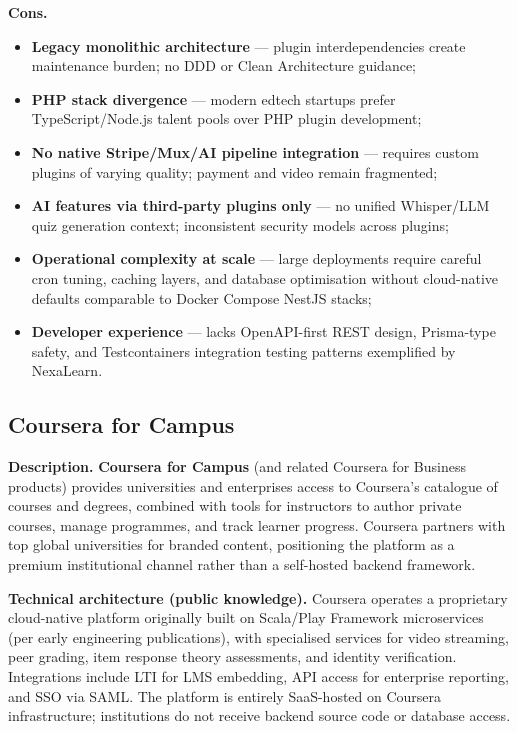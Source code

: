 \textbf{Cons.}
\begin{itemize}
  \item \textbf{Legacy monolithic architecture} --- plugin interdependencies create maintenance burden; no DDD or Clean Architecture guidance;
  \item \textbf{PHP stack divergence} --- modern edtech startups prefer TypeScript/Node.js talent pools over PHP plugin development;
  \item \textbf{No native Stripe/Mux/AI pipeline integration} --- requires custom plugins of varying quality; payment and video remain fragmented;
  \item \textbf{AI features via third-party plugins only} --- no unified Whisper/LLM quiz generation context; inconsistent security models across plugins;
  \item \textbf{Operational complexity at scale} --- large deployments require careful cron tuning, caching layers, and database optimisation without cloud-native defaults comparable to Docker Compose NestJS stacks;
  \item \textbf{Developer experience} --- lacks OpenAPI-first REST design, Prisma-type safety, and Testcontainers integration testing patterns exemplified by NexaLearn.
\end{itemize}

\subsection{Coursera for Campus}
\label{subsec:coursera}

\textbf{Description.}
\textbf{Coursera for Campus} (and related Coursera for Business products) provides universities and enterprises access to Coursera's catalogue of courses and degrees, combined with tools for instructors to author private courses, manage programmes, and track learner progress. Coursera partners with top global universities for branded content, positioning the platform as a premium institutional channel rather than a self-hosted backend framework.

\textbf{Technical architecture (public knowledge).}
Coursera operates a proprietary cloud-native platform originally built on Scala/Play Framework microservices (per early engineering publications), with specialised services for video streaming, peer grading, item response theory assessments, and identity verification. Integrations include LTI for LMS embedding, API access for enterprise reporting, and SSO via SAML. The platform is entirely SaaS-hosted on Coursera infrastructure; institutions do not receive backend source code or database access.

